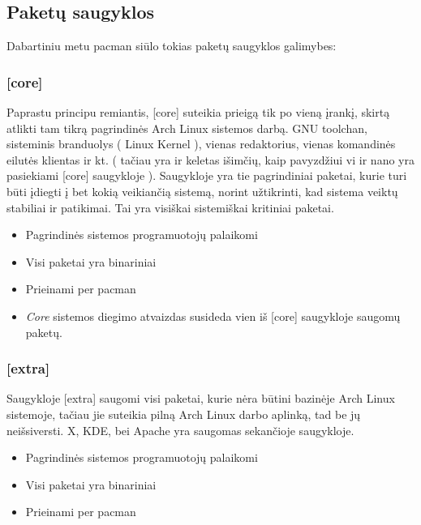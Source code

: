     \subsection{Paketų saugyklos}

      Dabartiniu metu pacman siūlo tokias paketų saugyklos galimybes:

      \subsubsection{[core]} 

        Paprastu principu remiantis, [core] suteikia prieigą tik po
        vieną įrankį, skirtą atlikti tam tikrą pagrindinės Arch Linux
        sistemos darbą. GNU toolchan, sisteminis branduolys ( Linux
        Kernel ), vienas redaktorius, vienas komandinės eilutės
        klientas ir kt. ( tačiau yra ir keletas išimčių, kaip
        pavyzdžiui vi ir nano yra pasiekiami [core] saugykloje
        ). Saugykloje yra tie pagrindiniai paketai, kurie turi būti
        įdiegti į bet kokią veikiančią sistemą, norint užtikrinti, kad
        sistema veiktų stabiliai ir patikimai. Tai yra visiškai
        sistemiškai kritiniai paketai.

        \begin{itemize}
          \item Pagrindinės sistemos programuotojų palaikomi
          \item Visi paketai yra binariniai
          \item Prieinami per pacman
          \item \textsl{Core} sistemos diegimo atvaizdas susideda vien
            iš [core] saugykloje saugomų paketų.
        \end{itemize}

      \subsubsection{[extra]}

        Saugykloje [extra] saugomi visi paketai, kurie nėra būtini
        bazinėje Arch Linux sistemoje, tačiau jie suteikia pilną Arch
        Linux darbo aplinką, tad be jų neišsiversti. X, KDE, bei
        Apache yra saugomas sekančioje saugykloje.

        \begin{itemize}
          \item Pagrindinės sistemos programuotojų palaikomi
          \item Visi paketai yra binariniai
          \item Prieinami per pacman
        \end{itemize}
      
